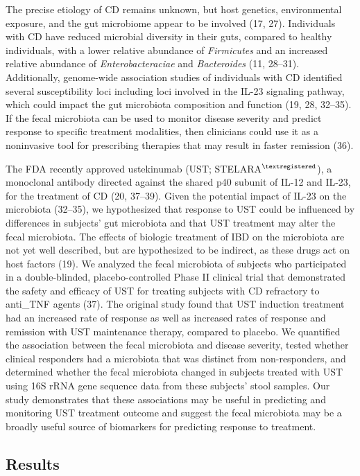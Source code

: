 \documentclass[12pt,]{article}
\begin{document}
The precise etiology of CD remains unknown, but host genetics,
environmental exposure, and the gut microbiome appear to be involved
(17, 27). Individuals with CD have reduced microbial diversity in their
guts, compared to healthy individuals, with a lower relative abundance
of \emph{Firmicutes} and an increased relative abundance of
\emph{Enterobacteraciae} and \emph{Bacteroides} (11, 28--31).
Additionally, genome-wide association studies of individuals with CD
identified several susceptibility loci including loci involved in the
IL-23 signaling pathway, which could impact the gut microbiota
composition and function (19, 28, 32--35). If the fecal microbiota can
be used to monitor disease severity and predict response to specific
treatment modalities, then clinicians could use it as a noninvasive tool
for prescribing therapies that may result in faster remission (36).

The FDA recently approved ustekinumab (UST;
STELARA\(^{\textregistered}\)), a monoclonal antibody directed against
the shared p40 subunit of IL-12 and IL-23, for the treatment of CD (20,
37--39). Given the potential impact of IL-23 on the microbiota (32--35),
we hypothesized that response to UST could be influenced by differences
in subjects' gut microbiota and that UST treatment may alter the fecal
microbiota. The effects of biologic treatment of IBD on the microbiota
are not yet well described, but are hypothesized to be indirect, as
these drugs act on host factors (19). We analyzed the fecal microbiota
of subjects who participated in a double-blinded, placebo-controlled
Phase II clinical trial that demonstrated the safety and efficacy of UST
for treating subjects with CD refractory to anti\_TNF agents (37). The
original study found that UST induction treatment had an increased rate
of response as well as increased rates of response and remission with
UST maintenance therapy, compared to placebo. We quantified the
association between the fecal microbiota and disease severity, tested
whether clinical responders had a microbiota that was distinct from
non-responders, and determined whether the fecal microbiota changed in
subjects treated with UST using 16S rRNA gene sequence data from these
subjects' stool samples. Our study demonstrates that these associations
may be useful in predicting and monitoring UST treatment outcome and
suggest the fecal microbiota may be a broadly useful source of
biomarkers for predicting response to treatment.

\subsection{Results}\label{results}
\end{document}
